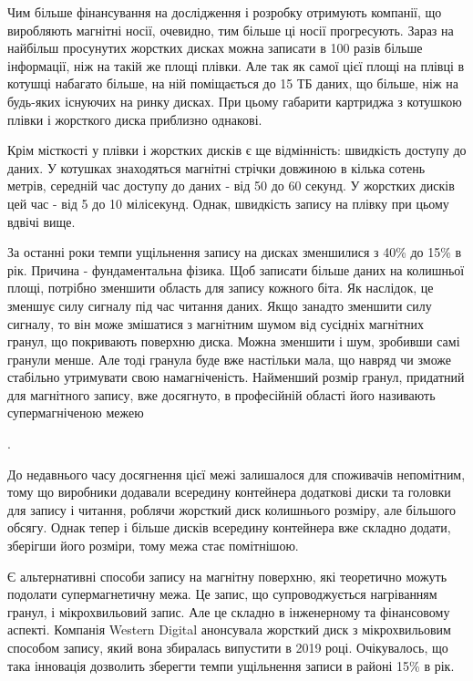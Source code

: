 \documentclass[a4paper,14pt]{extreport}
\begin{document}
Чим більше фінансування на дослідження і розробку отримують компанії, що виробляють магнітні носії, очевидно, тим більше ці носії прогресують. Зараз на найбільш просунутих жорстких дисках можна записати в 100 разів більше інформації, ніж на такій же площі плівки. Але так як самої цієї площі на плівці в котушці набагато більше, на ній поміщається до 15 ТБ даних, що більше, ніж на будь-яких існуючих на ринку дисках. При цьому габарити картриджа з котушкою плівки і жорсткого диска приблизно однакові.\par

Крім місткості у плівки і жорстких дисків є ще відмінність: швидкість доступу до даних. У котушках знаходяться магнітні стрічки довжиною в кілька сотень метрів, середній час доступу до даних - від 50 до 60 секунд. У жорстких дисків цей час - від 5 до 10 мілісекунд. Однак, швидкість запису на плівку при цьому вдвічі вище\cite{lit2}.\par

За останні роки темпи ущільнення запису на дисках зменшилися з 40\% до 15\% в рік. Причина - фундаментальна фізика. Щоб записати більше даних на колишньої площі, потрібно зменшити область для запису кожного біта. Як наслідок, це зменшує силу сигналу під час читання даних. Якщо занадто зменшити силу сигналу, то він може змішатися з магнітним шумом від сусідніх магнітних гранул, що покривають поверхню диска. Можна зменшити і шум, зробивши самі гранули менше. Але тоді гранула буде вже настільки мала, що навряд чи зможе стабільно утримувати свою намагніченість. Найменший розмір гранул, придатний для магнітного запису, вже досягнуто, в професійній області його називають супермагніченою межею\par.

До недавнього часу досягнення цієї межі залишалося для споживачів непомітним, тому що виробники додавали всередину контейнера додаткові диски та головки для запису і читання, роблячи жорсткий диск колишнього розміру, але більшого обсягу. Однак тепер і більше дисків всередину контейнера вже складно додати, зберігши його розміри, тому межа стає помітнішою.\par

Є альтернативні способи запису на магнітну поверхню, які теоретично можуть подолати супермагнетичну межа. Це запис, що супроводжується нагріванням гранул, і мікрохвильовий запис. Але це складно в інженерному та фінансовому аспекті. Компанія Western Digital анонсувала жорсткий диск з мікрохвильовим способом запису, який вона збиралась випустити в 2019 році. Очікувалось, що така інновація дозволить зберегти темпи ущільнення записи в районі 15\% в рік.\par
\end{document}
